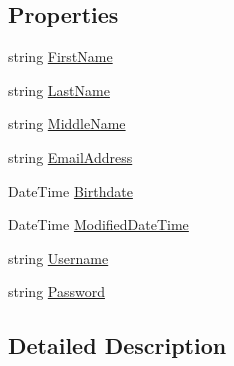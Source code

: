 \subsection*{Properties}
\begin{DoxyCompactItemize}
\item 
string \hyperlink{class_plex_byte_1_1_mo_cap_1_1_security_1_1_user_a96c459a22a26f039f17e2e84f486db36}{First\+Name}
\item 
string \hyperlink{class_plex_byte_1_1_mo_cap_1_1_security_1_1_user_a9313e5d0899cddf88e7171da9fbb9e31}{Last\+Name}
\item 
string \hyperlink{class_plex_byte_1_1_mo_cap_1_1_security_1_1_user_af6fccb21254c949d6f58f9011e2a25c4}{Middle\+Name}
\item 
string \hyperlink{class_plex_byte_1_1_mo_cap_1_1_security_1_1_user_a0d766fcc163f7db495d4ef261a6ef02b}{Email\+Address}
\item 
Date\+Time \hyperlink{class_plex_byte_1_1_mo_cap_1_1_security_1_1_user_a91c0564f89d8eb7eb0e19cf9bbf6f195}{Birthdate}
\item 
Date\+Time \hyperlink{class_plex_byte_1_1_mo_cap_1_1_security_1_1_user_a412d3fe8c1013bd3ac76217717fe5814}{Modified\+Date\+Time}
\item 
string \hyperlink{class_plex_byte_1_1_mo_cap_1_1_security_1_1_user_ab82f0c260e1863ade8f069da91405ab2}{Username}
\item 
string \hyperlink{class_plex_byte_1_1_mo_cap_1_1_security_1_1_user_aa83a2d092f69dabaafb5c8d5646fa4f9}{Password}
\end{DoxyCompactItemize}


\subsection{Detailed Description}


